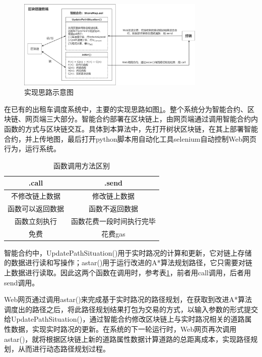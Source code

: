 \begin{figure}[ht]
  \centering
  \includegraphics[width=0.8\textwidth]{undergraduate-thesis/images/AlgorithmInteractive.png}
  \caption{实现思路示意图}
  \label{algorithm-interactive} %
\end{figure}

在已有的出租车调度系统中，主要的实现思路如图\ref{algorithm-interactive}。整个系统分为智能合约、区块链、网页端三大部分。智能合约部署在区块链上，由网页端通过调用智能合约内函数的方式与区块链交互。具体到本算法中，先打开树状区块链，在其上部署智能合约，并上传地图，最后打开python脚本用自动化工具selenium自动控制Web网页行为，运行系统。
\begin{table}[ht]
    \linespread{1.5}
    \centering
    \caption{函数调用方法区别}
    \label{callandsend}
    \begin{tabular}{cc}
    \toprule
    .call & .send\\
    \hline
    不修改链上数据 & 修改链上数据 \\
    函数可以返回数据 & 函数不返回数据 \\
    函数立刻执行 & 函数花费一段时间执行完毕 \\
    免费 & 花费gas \\
    \bottomrule
    \end{tabular}
\end{table}

智能合约中，UpdatePathSituation()用于实时路况的计算和更新，它对链上存储的数据进行读和写操作；astar()用于运行改进的A*算法规划路径，它只需要对链上数据进行读取。因此这两个函数在调用时，参考表\ref{callandsend}，前者用call调用，后者用send调用。

Web网页通过调用astar()来完成基于实时路况的路径规划，在获取到改进A*算法调度出的路径之后，将此路径规划结果打包为交易的方式，以输入参数的形式提交给UpdatePathSituation()，通过智能合约修改区块链上与实时路况相关的道路属性数据，实现实时路况的更新。在系统的下一轮运行时，Web网页再次调用astar()，就将根据区块链上新的道路属性数据计算道路的总距离成本，实现路径规划，从而进行动态路径规划过程。

